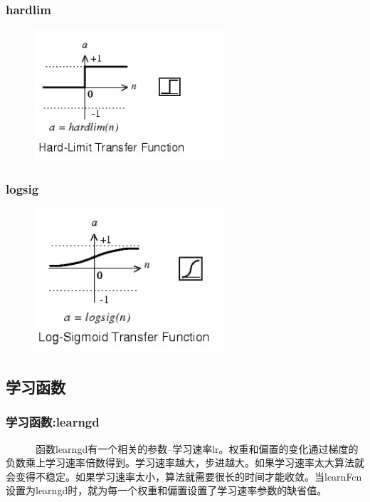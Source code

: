 \documentclass[slidestop,compress,mathserif,c]{beamer}
\begin{document}
\begin{frame}
\frametitle{hardlim}
\begin{figure}
\centering
\includegraphics[width=7cm]{hardlim}
\end{figure}


\end{frame}



\begin{frame}
\frametitle{logsig}
\begin{figure}
\centering
\includegraphics[width=7cm]{logsig}
\end{figure}

\end{frame}

\subsection{学习函数}
\begin{frame}
\frametitle{学习函数:learngd}
~~~~~~函数learngd有一个相关的参数--学习速率lr。权重和偏置的变化通过梯度的负数乘上学习速率倍数得到。学习速率越大，步进越大。如果学习速率太大算法就会变得不稳定。如果学习速率太小，算法就需要很长的时间才能收敛。当learnFcn设置为learngd时，就为每一个权重和偏置设置了学习速率参数的缺省值。

\end{frame}
\end{document}
